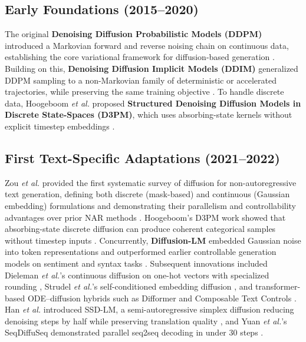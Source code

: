 \subsection{Early Foundations (2015–2020)}
The original \textbf{Denoising Diffusion Probabilistic Models (DDPM)} introduced a Markovian forward and reverse noising chain on continuous data, establishing the core variational framework for diffusion-based generation \cite{ho_denoising_2020}. Building on this, \textbf{Denoising Diffusion Implicit Models (DDIM)} generalized DDPM sampling to a non-Markovian family of deterministic or accelerated trajectories, while preserving the same training objective \cite{song_denoising_2020}. To handle discrete data, Hoogeboom \emph{et al.} proposed \textbf{Structured Denoising Diffusion Models in Discrete State-Spaces (D3PM)}, which uses absorbing-state kernels without explicit timestep embeddings \cite{hoogeboom_structured_2021}.

\subsection{First Text-Specific Adaptations (2021–2022)}
Zou \emph{et al.} provided the first systematic survey of diffusion for non-autoregressive text generation, defining both discrete (mask-based) and continuous (Gaussian embedding) formulations and demonstrating their parallelism and controllability advantages over prior NAR methods \cite{zou_survey_2023}. Hoogeboom’s D3PM work showed that absorbing-state discrete diffusion can produce coherent categorical samples without timestep inputs \cite{hoogeboom_structured_2021}. Concurrently, \textbf{Diffusion-LM} embedded Gaussian noise into token representations and outperformed earlier controllable generation models on sentiment and syntax tasks \cite{li_diffusion-lm_2022}. Subsequent innovations included Dieleman \emph{et al.}’s continuous diffusion on one-hot vectors with specialized rounding \cite{dieleman_continuous_2022}, Strudel \emph{et al.}’s self-conditioned embedding diffusion \cite{strudel_selfconditioned_2021}, and transformer-based ODE–diffusion hybrids such as Difformer \cite{gong_difformer_2022} and Composable Text Controls \cite{liu_composable_2022}. Han \emph{et al.} introduced SSD-LM, a semi-autoregressive simplex diffusion reducing denoising steps by half while preserving translation quality \cite{han_ssdlm_2022}, and Yuan \emph{et al.}’s SeqDiffuSeq demonstrated parallel seq2seq decoding in under 30 steps \cite{yuan_seqdiffuseq_2021}.

